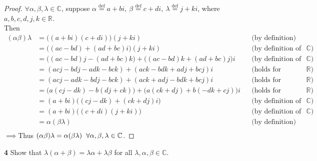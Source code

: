 \documentclass{article}
\begin{document}
\begin{proof}
    $\forall \alpha, \beta, \lambda \in \mathbb{C}$, suppose $\alpha \stackrel{\text{def}}{=} a + bi, \  \beta \stackrel{\text{def}}{=} c + di, \ \lambda \stackrel{\text{def}}{=} j + ki$, where $a, b, c, d, j, k \in \mathbb{R}$.\\
    \indent Then
    \begin{align*}
        (\alpha\beta)\lambda &= \Big((a + bi)(c + di)\Big)(j + ki) &&\text{(by definition)}\\
        &= \Big((ac - bd) + (ad + bc)i\Big)(j + ki) &&\text{(by definition of multiplication over $\mathbb{C}$)}\\
        &= \Big((ac - bd)j - (ad + bc)k\Big) + \Big((ac - bd)k + (ad + bc)j\Big)i &&\text{(by definition of multiplication over $\mathbb{C}$)}\\
        &= (acj - bdj - adk - bck) + (ack - bdk + adj + bcj)i &&\text{(holds for distributivity over $\mathbb{R}$)}\\
        &= (acj - adk - bdj - bck) + (ack + adj - bdk + bcj)i &&\text{(holds for commutativity over $\mathbb{R}$)}\\
        &= \Big(a(cj - dk) - b(dj + ck)\Big) + \Big(a(ck + dj) + b(-dk + cj)\Big)i &&\text{(holds for distributivity over $\mathbb{R}$)}\\
        &= (a + bi)\Big((cj - dk) + (ck + dj)i\Big) &&\text{(by definition of multiplication over $\mathbb{C}$)}\\
        &= (a + bi)\Big((c + di)(j + ki)\Big) &&\text{(by definition of multiplication over $\mathbb{C}$)}\\
        &= \alpha(\beta\lambda) &&\text{(by definition)}\\
    \end{align*}
    $\implies$Thus $(\alpha\beta)\lambda = \alpha(\beta\lambda) \hspace{2 mm} \forall \alpha, \beta, \lambda \in \mathbb{C}$.

\end{proof}
\color{black}

\noindent \textbf{4} \hspace{3 mm} Show that $\lambda(\alpha + \beta) = \lambda\alpha + \lambda\beta$ for all $\lambda, \alpha, \beta \in \mathbb{C}$. \color{red}
\end{document}
